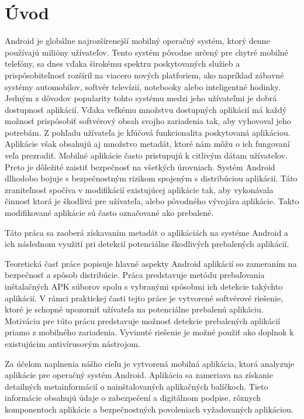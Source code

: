 \chapter{Úvod}
Android je globálne najrozšírenejší mobilný operačný systém, ktorý denne používajú milióny užívateľov. Tento systém pôvodne určený pre chytré mobilné telefóny, sa dnes vďaka širokému spektru poskytovaných služieb a prispôsobiteľnosť rozšíril na viacero nových platforiem, ako napríklad zábavné systémy automobilov, softvér televízií, notebooky alebo inteligentné hodinky. Jedným z dôvodov popularity tohto systému medzi jeho užívateľmi je dobrá dostupnosť aplikácií. Vďaka veľkému množstvu dostupných aplikácií má každý možnosť prispôsobiť softvérový obsah svojho zariadenia tak, aby vyhovoval jeho potrebám. Z pohľadu užívateľa je kľúčová funkcionalita poskytovaná aplikáciou. Aplikácie však obsahujú aj množstvo metadát, ktoré nám môžu o ich fungovaní veľa prezradiť. Mobilné aplikácie často pristupujú k citlivým dátam užívateľov. Preto je dôležité zaistiť bezpečnosť na všetkých úrovniach. Systém Android dlhodobo bojuje s bezpečnostným rizikom spojeným s distribúciou aplikácií. Táto zraniteľnosť spočíva v modifikácií existujúcej aplikácie tak, aby vykonávala činnosť ktorá je škodlivá pre užívateľa, alebo pôvodného vývojára aplikácie. Takto modifikované aplikácie sú často označované ako prebalené.

Táto práca sa zaoberá získavaním metadát o aplikáciách na systéme Android a ich následnom využití pri detekcií potenciálne škodlivých prebalených aplikácií.

Teoretická časť práce popisuje hlavné aspekty Android aplikácií so zameraním na bezpečnosť a spôsob distribúcie. Práca predstavuje metódu prebaľovania inštalačných APK súborov spolu s vybranými spôsobmi ich detekcie takýchto aplikácií.
V rámci praktickej časti tejto práce je vytvorené softvérové riešenie, ktoré je schopné upozorniť užívateľa na potenciálne prebalenú aplikáciu. Motiváciu pre túto prácu predstavuje možnosť detekcie prebalených aplikácií priamo z mobilného zariadenia. Vyvinuté riešenie je možné použiť ako doplnok k existujúcim antivírusovým nástrojom.

Za účelom naplnenia nášho cieľu je vytvorená mobilná aplikácia, ktorá analyzuje aplikácie pre operačný systém Android. Aplikácia sa zameriava na získanie detailných metainformácií o nainštalovaných aplikačných balíčkoch. Tieto informácie obsahujú údaje o zabezpečení a digitálnom podpise, rôznych komponentoch aplikácie a bezpečnostných povoleniach vyžadovaných aplikáciou.

